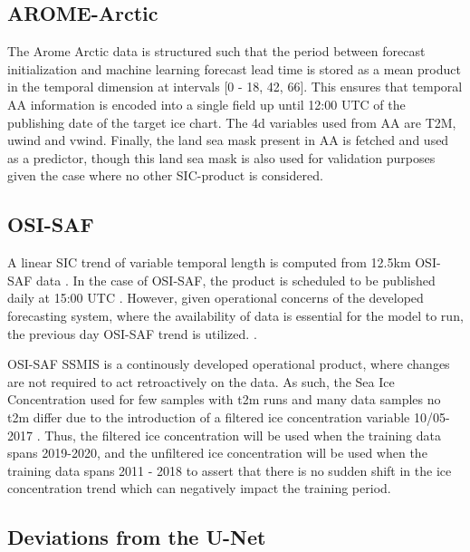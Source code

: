 \documentclass[../main/thesis]{subfiles}
\begin{document}
\subsection{AROME-Arctic}
The Arome Arctic data is structured such that the period between forecast initialization and machine learning forecast lead time is stored as a mean product in the temporal dimension at intervals [0 - 18, 42, 66]. This ensures that temporal AA information is encoded into a single field up until 12:00 UTC of the publishing date of the target ice chart. The 4d variables used from AA are T2M, uwind and vwind. Finally, the land sea mask present in AA is fetched and used as a predictor, though this land sea mask is also used for validation purposes given the case where no other SIC-product is considered.

\subsection{OSI-SAF}
A linear SIC trend of variable temporal length is computed from 12.5km OSI-SAF data . In the case of OSI-SAF, the product is scheduled to be published daily at 15:00 UTC . However, given operational concerns of the developed forecasting system, where the availability of data is essential for the model to run, the previous day OSI-SAF trend is utilized. .

OSI-SAF SSMIS is a continously developed operational product, where changes are not required to act retroactively on the data. As such, the Sea Ice Concentration used for few samples with t2m runs and many data samples no t2m differ due to the introduction of a filtered ice concentration variable 10/05-2017 \cite{Tonboe2017}. Thus, the filtered ice concentration will be used when the training data spans 2019-2020, and the unfiltered ice concentration will be used when the training data spans 2011 - 2018 to assert that there is no sudden shift in the ice concentration trend which can negatively impact the training period.


\subsection{Deviations from the U-Net}
\end{document}
